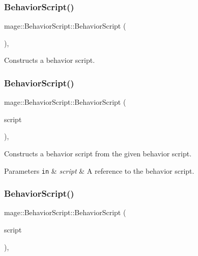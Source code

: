 \subsubsection{\texorpdfstring{Behavior\+Script()}{BehaviorScript()}\hspace{0.1cm}{\footnotesize\ttfamily [1/3]}}
{\footnotesize\ttfamily mage\+::\+Behavior\+Script\+::\+Behavior\+Script (\begin{DoxyParamCaption}{ }\end{DoxyParamCaption})\hspace{0.3cm}{\ttfamily [protected]}, {\ttfamily [default]}}

Constructs a behavior script. \hypertarget{classmage_1_1_behavior_script_ad5f522280746f2834b8962d25e66b19e}{}\label{classmage_1_1_behavior_script_ad5f522280746f2834b8962d25e66b19e} 
\subsubsection{\texorpdfstring{Behavior\+Script()}{BehaviorScript()}\hspace{0.1cm}{\footnotesize\ttfamily [2/3]}}
{\footnotesize\ttfamily mage\+::\+Behavior\+Script\+::\+Behavior\+Script (\begin{DoxyParamCaption}\item[{const \hyperlink{classmage_1_1_behavior_script}{Behavior\+Script} \&}]{script }\end{DoxyParamCaption})\hspace{0.3cm}{\ttfamily [protected]}, {\ttfamily [default]}}

Constructs a behavior script from the given behavior script.


\begin{DoxyParams}[1]{Parameters}
\mbox{\tt in}  & {\em script} & A reference to the behavior script. \\
\hline
\end{DoxyParams}
\hypertarget{classmage_1_1_behavior_script_acaa526b9c530951df4bfea531242c05b}{}\label{classmage_1_1_behavior_script_acaa526b9c530951df4bfea531242c05b} 
\subsubsection{\texorpdfstring{Behavior\+Script()}{BehaviorScript()}\hspace{0.1cm}{\footnotesize\ttfamily [3/3]}}
{\footnotesize\ttfamily mage\+::\+Behavior\+Script\+::\+Behavior\+Script (\begin{DoxyParamCaption}\item[{\hyperlink{classmage_1_1_behavior_script}{Behavior\+Script} \&\&}]{script }\end{DoxyParamCaption})\hspace{0.3cm}{\ttfamily [protected]}, {\ttfamily [default]}}

